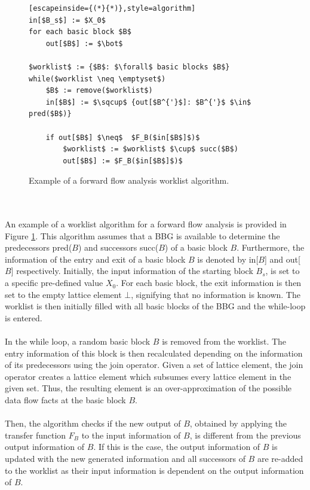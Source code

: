 \documentclass{kththesis}
\begin{document}
\begin{figure}[t]
    \centering
\begin{algorithmFrame}
\begin{lstlisting}[escapeinside={(*}{*)},style=algorithm]
in[$B_s$] := $X_0$
for each basic block $B$
    out[$B$] := $\bot$
    
$worklist$ := {$B$: $\forall$ basic blocks $B$}
while($worklist \neq \emptyset$)
    $B$ := remove($worklist$)
    in[$B$] := $\sqcup$ {out[$B^{'}$]: $B^{'}$ $\in$ pred($B$)}
    
    if out[$B$] $\neq$  $F_B($in[$B$]$)$
        $worklist$ := $worklist$ $\cup$ succ($B$)
        out[$B$] := $F_B($in[$B$]$)$
\end{lstlisting}
\end{algorithmFrame}
\caption[Example of a forward flow analysis worklist algorithm.]{Example of a forward flow analysis worklist algorithm.}
    \label{fig:WorklistAlgo}
\end{figure}
\noindent
\\ \\
An example of a worklist algorithm for a forward flow analysis is provided in Figure \ref{fig:WorklistAlgo}. This algorithm assumes that a BBG is available to determine the predecessors pred($B$) and successors succ($B$) of a basic block $B$. Furthermore, the information of the entry and exit of a basic block $B$ is denoted by in[$B$] and out[$B$] respectively. Initially, the  input information of the starting block $B_s$, is set to a specific pre-defined value $X_0$. For each basic block, the exit information is then set to the empty lattice element $\bot$, signifying that no information is known. The worklist is then initially filled with all basic blocks of the BBG and the while-loop is entered.
\\ \\
In the while loop, a random basic block $B$ is removed from the worklist. The entry information of this block is then recalculated depending on the information of its predecessors using the join operator. Given a set of lattice element, the join operator creates a lattice element which subsumes every lattice element in the given set. Thus, the resulting element is an over-approximation of the possible data flow facts at the basic block $B$.
\\ \\
Then, the algorithm checks if the new output of $B$, obtained by applying the transfer function $F_B$ to the input information of $B$, is different from the previous output information of $B$. If this is the case, the output information of $B$ is updated with the new generated information and all successors of $B$ are re-added to the worklist as their input information is dependent on the output information of $B$.
\end{document}
